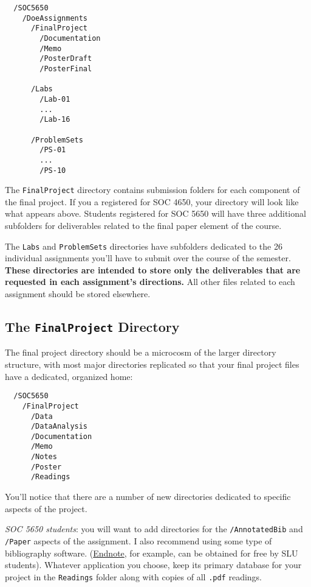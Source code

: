 \documentclass[]{book}
\begin{document}
\begin{verbatim}
  /SOC5650
    /DoeAssignments
      /FinalProject
        /Documentation
        /Memo
        /PosterDraft
        /PosterFinal
        
      /Labs
        /Lab-01
        ...
        /Lab-16
        
      /ProblemSets
        /PS-01
        ...
        /PS-10
\end{verbatim}

The \texttt{FinalProject} directory contains submission folders for each
component of the final project. If you a registered for SOC 4650, your
directory will look like what appears above. Students registered for SOC
5650 will have three additional subfolders for deliverables related to
the final paper element of the course.

The \texttt{Labs} and \texttt{ProblemSets} directories have subfolders
dedicated to the 26 individual assignments you'll have to submit over
the course of the semester. \textbf{These directories are intended to
store only the deliverables that are requested in each assignment's
directions.} All other files related to each assignment should be stored
elsewhere.

\subsection{\texorpdfstring{The \texttt{FinalProject}
Directory}{The FinalProject Directory}}\label{the-finalproject-directory}

The final project directory should be a microcosm of the larger
directory structure, with most major directories replicated so that your
final project files have a dedicated, organized home:

\begin{verbatim}
  /SOC5650
    /FinalProject
      /Data
      /DataAnalysis
      /Documentation
      /Memo
      /Notes
      /Poster
      /Readings
\end{verbatim}

You'll notice that there are a number of new directories dedicated to
specific aspects of the project.

\emph{SOC 5650 students}: you will want to add directories for the
\texttt{/AnnotatedBib} and \texttt{/Paper} aspects of the assignment. I
also recommend using some type of bibliography software.
(\href{http://endnote.com}{Endnote}, for example, can be obtained for
free by SLU students). Whatever application you choose, keep its primary
database for your project in the \texttt{Readings} folder along with
copies of all \texttt{.pdf} readings.
\end{document}
